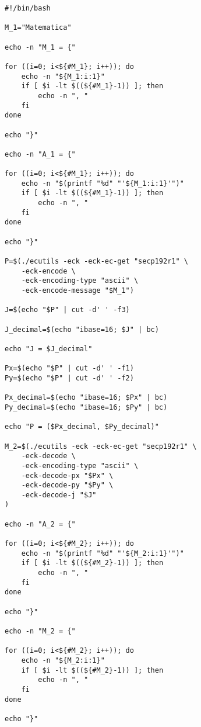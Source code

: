 
 \label{anexo:0eca4a2b-8a60-41b3-8d25-2f8056b51dfd}
\begin{verbatim}
#!/bin/bash

M_1="Matematica"

echo -n "M_1 = {"

for ((i=0; i<${#M_1}; i++)); do
    echo -n "${M_1:i:1}" 
    if [ $i -lt $((${#M_1}-1)) ]; then
        echo -n ", " 
    fi
done

echo "}" 

echo -n "A_1 = {"

for ((i=0; i<${#M_1}; i++)); do
    echo -n "$(printf "%d" "'${M_1:i:1}'")"
    if [ $i -lt $((${#M_1}-1)) ]; then
        echo -n ", "
    fi
done

echo "}"

P=$(./ecutils -eck -eck-ec-get "secp192r1" \
    -eck-encode \
    -eck-encoding-type "ascii" \
    -eck-encode-message "$M_1")

J=$(echo "$P" | cut -d' ' -f3)

J_decimal=$(echo "ibase=16; $J" | bc)

echo "J = $J_decimal"

Px=$(echo "$P" | cut -d' ' -f1)
Py=$(echo "$P" | cut -d' ' -f2)

Px_decimal=$(echo "ibase=16; $Px" | bc)
Py_decimal=$(echo "ibase=16; $Py" | bc)

echo "P = ($Px_decimal, $Py_decimal)"

M_2=$(./ecutils -eck -eck-ec-get "secp192r1" \
    -eck-decode \
    -eck-encoding-type "ascii" \
    -eck-decode-px "$Px" \
    -eck-decode-py "$Py" \
    -eck-decode-j "$J"
)

echo -n "A_2 = {"

for ((i=0; i<${#M_2}; i++)); do
    echo -n "$(printf "%d" "'${M_2:i:1}'")"
    if [ $i -lt $((${#M_2}-1)) ]; then
        echo -n ", "
    fi
done

echo "}"

echo -n "M_2 = {"

for ((i=0; i<${#M_2}; i++)); do
    echo -n "${M_2:i:1}" 
    if [ $i -lt $((${#M_2}-1)) ]; then
        echo -n ", " 
    fi
done

echo "}" 
    
\end{verbatim}

